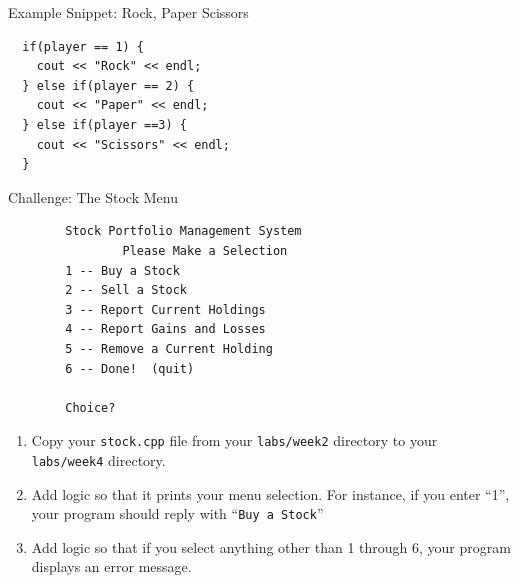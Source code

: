 \documentclass[]{beamer}
\begin{document}
\begin{frame}[fragile]{Example Snippet: Rock, Paper Scissors}
  \begin{BVerbatim}
  if(player == 1) {
    cout << "Rock" << endl;
  } else if(player == 2) {
    cout << "Paper" << endl;
  } else if(player ==3) {
    cout << "Scissors" << endl;
  }
  \end{BVerbatim}
\end{frame}

\begin{frame}[fragile]{Challenge: The Stock Menu}
  \begin{adjustbox}{max height=0.45\textheight}
  \begin{BVerbatim}
        Stock Portfolio Management System
                Please Make a Selection
        1 -- Buy a Stock
        2 -- Sell a Stock
        3 -- Report Current Holdings
        4 -- Report Gains and Losses
        5 -- Remove a Current Holding
        6 -- Done!  (quit) 

        Choice? 
  \end{BVerbatim}
  \end{adjustbox}
  \begin{enumerate}[<+(1)->]
    \item Copy your \texttt{stock.cpp} file from your \texttt{labs/week2} directory to your \texttt{labs/week4} directory.
    \item Add logic so that it prints your menu selection.  For instance, if you enter ``1'', your program should reply with ``\texttt{Buy a Stock}''
    \item Add logic so that if you select anything other than 1 through 6, your program displays an error message.
  \end{enumerate}
\end{frame}
\end{document}
